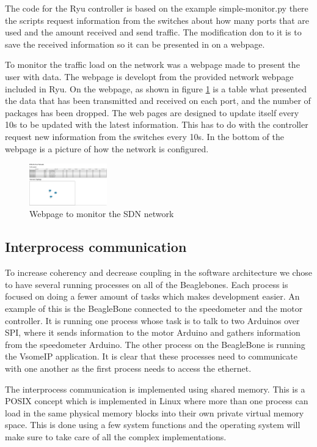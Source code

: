 \documentclass[11pt, titlepage]{article} %
\begin{document}
The code for the Ryu controller is based on the example simple-monitor.py there the scripts request information from the switches about how many ports that are used and the amount received and send traffic. The modification don to it is to save the received information so it can be presented in on a webpage.

To monitor the traffic load on the network was a webpage made to present the user with data. The webpage is developt from the provided network webpage included in Ryu. On the webpage, as shown in figure \ref{fig:webpage_sdn} is a table what presented the data that has been transmitted and received on each port, and the number of packages has been dropped. The web pages are designed to update itself every 10s to be updated with the latest information.  This has to do with the controller request new information from the switches every 10s.  In the bottom of the webpage is a picture of how the network is configured. 

\begin{figure}
	\includegraphics[width=0.3\textwidth]{webpage.PNG}
	\caption{Webpage to monitor the SDN network}
	\label{fig:webpage_sdn}
\end{figure}


\subsection{Interprocess communication}
To increase coherency and decrease coupling in the software architecture we chose to have several running processes on all of the Beaglebones. Each process is focused on doing a fewer amount of tasks which makes development easier. An example of this is the BeagleBone connected to the speedometer and the motor controller. It is running one process whose task is to talk to two Arduinos over SPI, where it sends information to the motor Arduino and gathers information from the speedometer Arduino. The other process on the BeagleBone is running the VsomeIP application. It is clear that these processes need to communicate with one another as the first process needs to access the ethernet.

The interprocess communication is implemented using shared memory. This is a POSIX concept which is implemented in Linux where more than one process can load in the same physical memory blocks into their own private virtual memory space. This is done using a few system functions and the operating system will make sure to take care of all the complex implementations.
\end{document}
